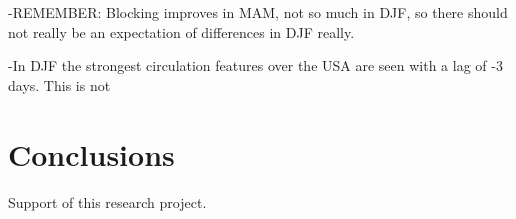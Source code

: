 \documentclass[12pt,varwidth]{article}
\begin{document}
-REMEMBER: Blocking improves in MAM, not so much in DJF, so there should not really be an expectation of differences in DJF really.

-In DJF the strongest circulation features over the USA are seen with a lag of -3 days. This is not 


\section{Conclusions}


\begin{acknowledgment} 
Support of this research project.
\end{acknowledgment}


\nolinenumbers
{}
{\clearpage}





\end{document}
